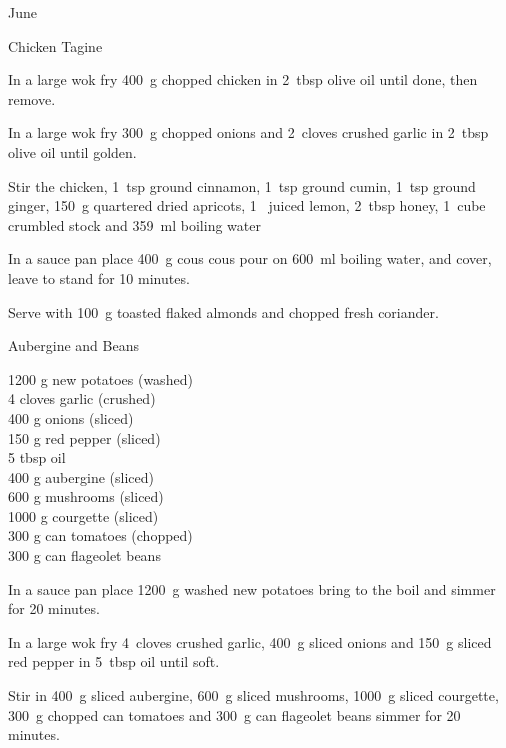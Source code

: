 \begin{menu}{June}
\begin{recipe}{2}{Chicken Tagine}
	
    \begin{instructions}
    \item 
        In a large wok fry
        400~g chopped chicken
        in
        2~tbsp  olive oil
        until done, then remove.
      \item 
        In a large wok fry
        300~g chopped onions
        and
        2~cloves crushed garlic
        in
        2~tbsp  olive oil
        until golden.
      \item 
        Stir the chicken,
        1~tsp  ground cinnamon,
        1~tsp  ground cumin,
        1~tsp  ground ginger,
        150~g quartered dried apricots,
        1~ juiced lemon,
        2~tbsp  honey,
        1~cube crumbled stock
        and
        359~ml  boiling water\item 
    In a
    sauce pan 
    place
    400~g  cous cous
    pour on
    600~ml  boiling water,
    and cover, leave to stand for 10 minutes.
  \item 
        Serve with
        100~g toasted flaked almonds
        and
         chopped fresh coriander.
      
    \end{instructions}
    \end{recipe}%
  
    \begin{recipe}{2}{Aubergine and Beans}%
		\begin{ingredients}
		1200 g new potatoes (washed) \\
	4 cloves garlic (crushed) \\
	400 g onions (sliced) \\
	150 g red pepper (sliced) \\
	5 tbsp oil  \\
	400 g aubergine (sliced) \\
	600 g mushrooms (sliced) \\
	1000 g courgette (sliced) \\
	300 g can tomatoes (chopped) \\
	300 g can flageolet beans  \\
	
		\end{ingredients}
	
	
    \begin{instructions}
    \item 
    In a sauce pan place
    1200~g washed new potatoes
    bring to the boil and simmer for 20 minutes.
  \item 
        In a large wok fry
        4~cloves crushed garlic,
        400~g sliced onions
        and
        150~g sliced red pepper
        in
        5~tbsp  oil
        until soft.
      \item 
        Stir in
        400~g sliced aubergine,
        600~g sliced mushrooms,
        1000~g sliced courgette,
        300~g chopped can tomatoes
        and
        300~g  can flageolet beans
        simmer for 20 minutes.
      

\end{instructions}
\end{recipe}
\end{menu}
